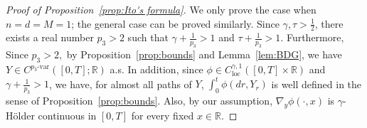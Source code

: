 \documentclass[11pt,reqno]{amsart}
\numberwithin{equation}{section}
\begin{document}
\begin{proof}[Proof of Proposition~\ref{prop:Ito's formula}]
\makeatletter{}\makeatother
\label{proof:Ito}
We only prove the case when $n=d=M=1$; the general case can be proved similarly. Since $\gamma,\tau>\frac{1}{2}$, there exists a real number $p_{3} > 2$  such that $\gamma + \frac{1}{p_{3}} > 1$ and $\tau + \frac{1}{p_{3}}>1$. Furthermore, Since $p_3>2,$ by Proposition~\ref{prop:bounds} and Lemma~\ref{lem:BDG}, we have $Y\in C^{p_{3}\text{-var}}([0,T];\mathbb{R})$ a.s. In addition, since $\phi\in C^{\gamma,1}_{\text{loc}}([0,T]\times\mathbb{R})$ and $\gamma + \frac{1}{p_{3}}>1$, we have, for almost all paths of $Y$,  $\int_{0}^{t}\phi(dr,Y_{r})$ is well defined in the sense of Proposition~\ref{prop:bounds}. Also, by our assumption, $\nabla_{y}\phi(\cdot,x)$ is $\gamma$-H\"older continuous in $[0,T]$ for every fixed $ x\in \mathbb{R}$. 


\end{proof}
\end{document}
